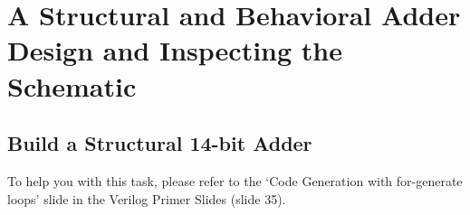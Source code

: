 \documentclass[11pt]{article}
\begin{document}

\section{A Structural and Behavioral Adder Design and Inspecting the Schematic}

\subsection{Build a Structural 14-bit Adder}
To help you with this task, please refer to the `Code Generation with for-generate loops' slide in the Verilog Primer Slides (slide 35).
\end{document}
